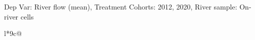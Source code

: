 \begin{table}[H]
\captionlistentry[table]{}
\label{table:beaver_hydrometry_DVflow_mean_SCg13}
\tiny %
Dep Var: River flow (mean), Treatment Cohorts: 2012, 2020, River sample: On-river cells \\
\begin{threeparttable}
\begin{tabulary}{\textwidth}{l*{9}{c}@{}}
\toprule \toprule
\noalign{\smallskip}
\noalign{\smallskip}
\midrule \bottomrule
\end{tabulary}
\medskip
\end{threeparttable}
\end{table}
